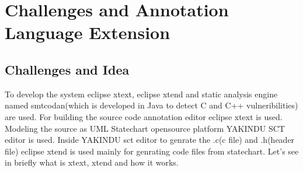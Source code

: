 \chapter{ Challenges and Annotation Language Extension}
\section{Challenges and Idea}

To develop the system eclipse xtext, eclipse xtend and static analysis engine named smtcodan(which is developed in Java to detect C and C++ vulneribilities) are used. For building the source code annotation editor eclipse xtext is used. Modeling the source as UML Statechart opensource platform YAKINDU SCT editor is used. Inside YAKINDU sct editor to genrate the .c(c file) and .h(header file) eclipse xtend is used mainly for genrating code files from statechart. Let's see in briefly what is xtext, xtend and how it works.

